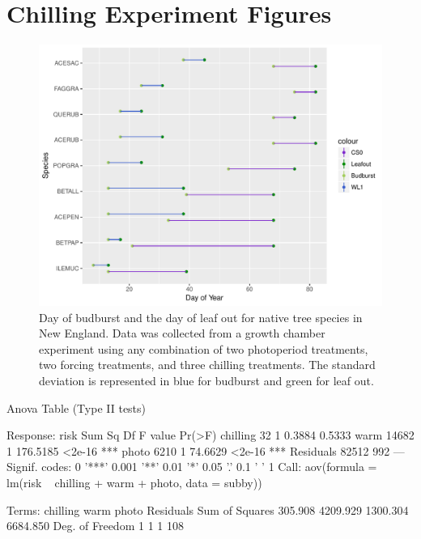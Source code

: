 \documentclass{article}\usepackage[]{graphicx}\usepackage[]{color}
\begin{document}
\renewcommand{\thetable}{\arabic{table}}
\renewcommand{\thefigure}{\arabic{figure}}
\renewcommand{\labelitemi}{$-$}
\section*{Chilling Experiment Figures}

\begin{figure} [H]
\begin{center}
\caption{Day of budburst and the day of leaf out for native tree species in New England. Data was collected from a growth chamber experiment using any combination of two photoperiod treatments, two forcing treatments, and three chilling treatments. The standard deviation is represented in blue for budburst and green for leaf out. }
\includegraphics{..//figure/Exp_plot.pdf} 
\end{center}
\end{figure}


Anova Table (Type II tests)

Response: risk
          Sum Sq  Df  F value Pr(>F)    
chilling      32   1   0.3884 0.5333    
warm       14682   1 176.5185 <2e-16 ***
photo       6210   1  74.6629 <2e-16 ***
Residuals  82512 992                    
---
Signif. codes:  0 '***' 0.001 '**' 0.01 '*' 0.05 '.' 0.1 ' ' 1
Call:
   aov(formula = lm(risk ~ chilling + warm + photo, data = subby))

Terms:
                chilling     warm    photo Residuals
Sum of Squares   305.908 4209.929 1300.304  6684.850
Deg. of Freedom        1        1        1       108
\end{document}
